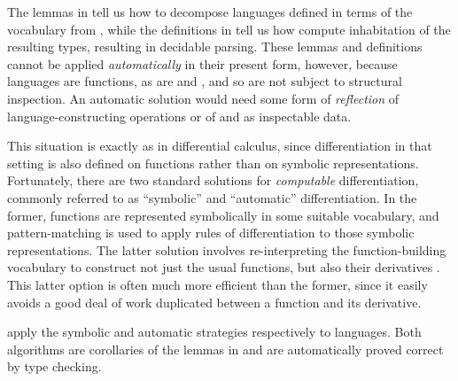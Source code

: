 \documentclass[acmsmall,screen,timestamp]{acmart}  %
\begin{document}


The lemmas in  tell us how to decompose languages defined in terms of the vocabulary from , while the definitions in  tell us how compute inhabitation of the resulting types, resulting in decidable parsing.
These lemmas and definitions cannot be applied \emph{automatically} in their present form, however, because languages are functions, as are  and , and so are not subject to structural inspection.
An automatic solution would need some form of \emph{reflection} of language-constructing operations or of  and  as inspectable data.

This situation is exactly as in differential calculus, since differentiation in that setting is also defined on functions rather than on symbolic representations.
Fortunately, there are two standard solutions for \emph{computable} differentiation, commonly referred to as ``symbolic'' and ``automatic'' differentiation.
In the former, functions are represented symbolically in some suitable vocabulary, and pattern-matching is used to apply rules of differentiation to those symbolic representations.
The latter solution involves re-interpreting the function-building vocabulary to construct not just the usual functions, but also their derivatives \citep{Griewank89onAD, GriewankWalther2008EvalDerivs, Elliott-2018-ad-icfp}.
This latter option is often much more efficient than the former, since it easily avoids a good deal of work duplicated between a function and its derivative.

 apply the symbolic and automatic strategies respectively to languages.
Both algorithms are corollaries of the lemmas in  and are automatically proved correct by type checking.

\rnc{}

\nc{}
\end{document}
